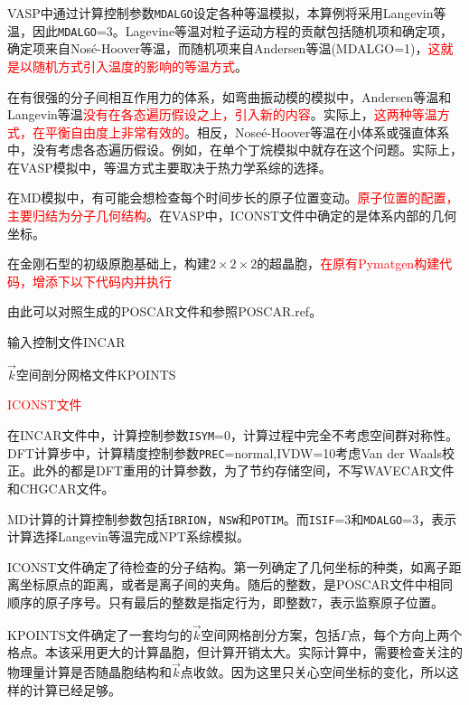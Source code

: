 \textrm{VASP}中通过计算控制参数\texttt{MDALGO}设定各种等温模拟，本算例将采用\textrm{Langevin}等温，因此\texttt{MDALGO}=3。\textrm{Lagevine}等温对粒子运动方程的贡献包括随机项和确定项，确定项来自\textrm{Nos\'e-Hoover}等温，而随机项来自\textrm{Andersen}等温(\textrm{MDALGO}=1)，\textcolor{red}{这就是以随机方式引入温度的影响的等温方式}。

在有很强的分子间相互作用力的体系，如弯曲振动模的模拟中，\textrm{Andersen}等温和\textrm{Langevin}等温\textcolor{red}{没有在各态遍历假设之上，引入新的内容}。实际上，\textcolor{red}{这两种等温方式，在平衡自由度上非常有效的}。相反，\textrm{Nose\'e-Hoover}等温在小体系或强直体系中，没有考虑各态遍历假设。例如，在单个丁烷模拟中就存在这个问题。实际上，在\textrm{VASP}模拟中，等温方式主要取决于热力学系综的选择。

在\textrm{MD}模拟中，有可能会想检查每个时间步长的原子位置变动。\textcolor{red}{原子位置的配置，主要归结为分子几何结构}。在\textrm{VASP}中，\textrm{ICONST}文件中确定的是体系内部的几何坐标。

在金刚石型的初级原胞基础上，构建$2\times2\times2$的超晶胞，\textcolor{red}{在原有\textrm{Pymatgen}构建代码，增添下以下代码内并执行}

由此可以对照生成的\textrm{POSCAR}文件和参照\textrm{POSCAR.ref}。

输入控制文件\textrm{INCAR}

$\vec k$空间剖分网格文件\textrm{KPOINTS}

\textcolor{red}{\textrm{ICONST}文件}

在\textrm{INCAR}文件中，计算控制参数\texttt{ISYM}=0，计算过程中完全不考虑空间群对称性。\textrm{DFT}计算步中，计算精度控制参数\texttt{PREC}\textrm{=normal},\textrm{IVDW}=10考虑\textrm{Van der Waals}校正。此外的都是\textrm{DFT}重用的计算参数，为了节约存储空间，不写\textrm{WAVECAR}文件和\textrm{CHGCAR}文件。

\textrm{MD}计算的计算控制参数包括\texttt{IBRION}，\texttt{NSW}和\texttt{POTIM}。而\texttt{ISIF}=3和\texttt{MDALGO}=3，表示计算选择\textrm{Langevin}等温完成\textrm{NPT}系综模拟。

\textrm{ICONST}文件确定了待检查的分子结构。第一列确定了几何坐标的种类，如离子距离坐标原点的距离，或者是离子间的夹角。随后的整数，是\textrm{POSCAR}文件中相同顺序的原子序号。只有最后的整数是指定行为，即整数7，表示监察原子位置。

\textrm{KPOINTS}文件确定了一套均匀的$\vec k$空间网格剖分方案，包括$\Gamma$点，每个方向上两个格点。本该采用更大的计算晶胞，但计算开销太大。实际计算中，需要检查关注的物理量计算是否随晶胞结构和$\vec k$点收敛。因为这里只关心空间坐标的变化，所以这样的计算已经足够。

